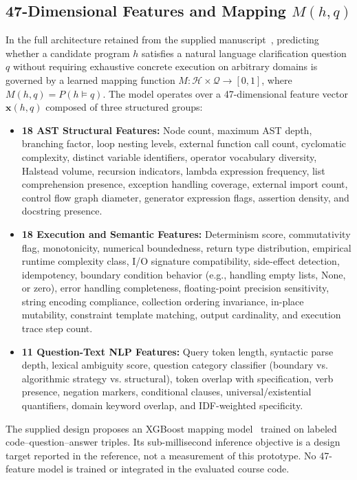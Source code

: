 \subsection{47-Dimensional Features and Mapping \texorpdfstring{$M(h,q)$}{M(h,q)}}

In the full architecture retained from the supplied manuscript~\cite{semsynthdesign}, predicting whether a candidate program $h$ satisfies a natural language clarification question $q$ without requiring exhaustive concrete execution on arbitrary domains is governed by a learned mapping function $M: \mathcal{H} \times \mathcal{Q} \to [0, 1]$, where $M(h, q) = P(h \models q)$. The model operates over a 47-dimensional feature vector $\mathbf{x}(h, q)$ composed of three structured groups:
\begin{itemize}
    \item \textbf{18 AST Structural Features:} Node count, maximum AST depth, branching factor, loop nesting levels, external function call count, cyclomatic complexity, distinct variable identifiers, operator vocabulary diversity, Halstead volume, recursion indicators, lambda expression frequency, list comprehension presence, exception handling coverage, external import count, control flow graph diameter, generator expression flags, assertion density, and docstring presence.
    \item \textbf{18 Execution and Semantic Features:} Determinism score, commutativity flag, monotonicity, numerical boundedness, return type distribution, empirical runtime complexity class, I/O signature compatibility, side-effect detection, idempotency, boundary condition behavior (e.g., handling empty lists, None, or zero), error handling completeness, floating-point precision sensitivity, string encoding compliance, collection ordering invariance, in-place mutability, constraint template matching, output cardinality, and execution trace step count.
    \item \textbf{11 Question-Text NLP Features:} Query token length, syntactic parse depth, lexical ambiguity score, question category classifier (boundary vs. algorithmic strategy vs. structural), token overlap with specification, verb presence, negation markers, conditional clauses, universal/existential quantifiers, domain keyword overlap, and IDF-weighted specificity.
\end{itemize}

The supplied design proposes an XGBoost mapping model~\cite{xgboost} trained on labeled code--question--answer triples. Its sub-millisecond inference objective is a design target reported in the reference, not a measurement of this prototype. No 47-feature model is trained or integrated in the evaluated course code.

